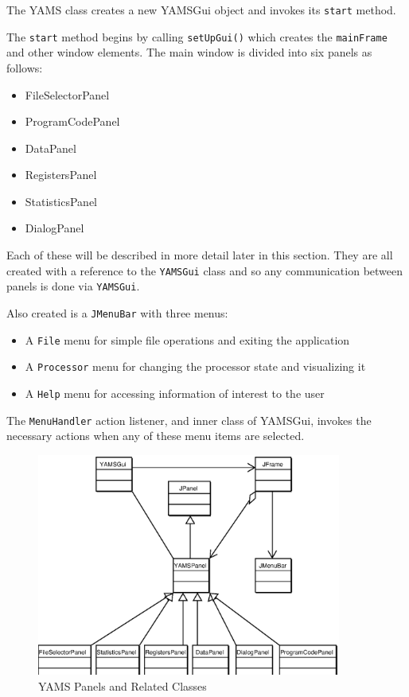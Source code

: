 
The YAMS class creates a new YAMSGui object and invokes its {\tt start} method.

The {\tt start} method begins by calling {\tt setUpGui()} which creates the {\tt mainFrame} and other window elements. The main window is divided into six panels as follows:

{\tt

\begin{itemize}
\item FileSelectorPanel
\item ProgramCodePanel
\item DataPanel
\item RegistersPanel
\item StatisticsPanel
\item DialogPanel
\end{itemize}

}

Each of these will be described in more detail later in this section. They are all created with a reference to the {\tt YAMSGui} class and so any communication between panels is done via {\tt YAMSGui}.

Also created is a {\tt JMenuBar} with three menus:

\begin{itemize}
\item A {\tt File} menu for simple file operations and exiting the application
\item A {\tt Processor} menu for changing the processor state and visualizing it
\item A {\tt Help} menu for accessing information of interest to the user
\end{itemize}

The {\tt MenuHandler} action listener, and inner class of YAMSGui, invokes the necessary actions when any of these menu items are selected.


\begin{figure}[htbp]
\begin{center}
\includegraphics[width=10cm]{YAMSPanelClasses.eps}
\end{center}
\caption{YAMS Panels and Related Classes}
\label{figLineList}
\end{figure}


